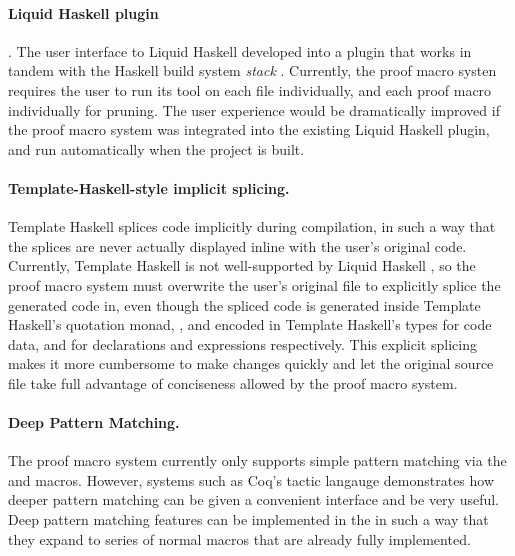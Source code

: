 \paragraph{Liquid Haskell plugin}.
The user interface to Liquid Haskell developed into a plugin that works in
tandem with the Haskell build system \textit{stack} . Currently,
the proof macro systen requires the user to run its tool on each file
individually, and each proof macro individually for pruning. The user experience
would be dramatically improved if the proof macro system was integrated into the
existing Liquid Haskell plugin, and run automatically when the project is built.

\paragraph{Template-Haskell-style implicit splicing.} 
Template Haskell splices code implicitly during compilation, in such a way that
the splices are never actually displayed inline with the user's original code.
Currently, Template Haskell is not well-supported by Liquid Haskell , so the proof macro system must overwrite the user's
original file to explicitly splice the generated code in, even though the
spliced code is generated inside Template Haskell's quotation monad, , and
encoded in Template Haskell's types for code data,  and  for
declarations and expressions respectively. This explicit splicing makes it more
cumbersome to make changes quickly and let the original source file take full
advantage of conciseness allowed by the proof macro system.

\paragraph{Deep Pattern Matching.}
The proof macro system currently only supports simple pattern matching via the
 and  macros. However, systems such as Coq's tactic
langauge demonstrates how deeper pattern matching can be given a convenient
interface and be very useful. Deep pattern matching features can be implemented
in the \LangA in such a way that they expand to series of normal macros that are
already fully implemented.

